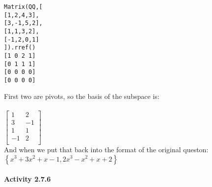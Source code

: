 \documentclass{article}
\begin{document}
\begin{verbatim}
Matrix(QQ,[
[1,2,4,3],
[3,-1,5,2],
[1,1,3,2],
[-1,2,0,1]
]).rref()
[1 0 2 1]
[0 1 1 1]
[0 0 0 0]
[0 0 0 0]
\end{verbatim}
First two are pivots, so the basis of the subspace is:\\
\\
$\left[\begin{matrix}
1 & 2  \\
3 & -1  \\
1 & 1  \\
-1 & 2  \\
\end{matrix}\right]$\\
And when we put that back into the format of the original queston:\\
$\left\{x^{3} + 3x^{2} + x - 1, 2x^{3} - x^{2} + x + 2\right\}$\\
\\
\newpage
\noindent \textbf{Activity 2.7.6}
\end{document}
